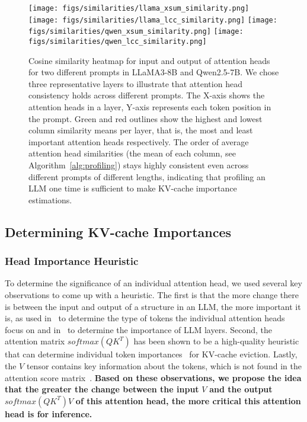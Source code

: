 \begin{figure}[h]
    \centering

    \texttt{[image: figs/similarities/llama\_xsum\_similarity.png]}
    \texttt{[image: figs/similarities/llama\_lcc\_similarity.png]}
    \hdashrule{\linewidth}{0.5pt}{1mm 1mm} %
    \texttt{[image: figs/similarities/qwen\_xsum\_similarity.png]}
    \texttt{[image: figs/similarities/qwen\_lcc\_similarity.png]}
    \caption{Cosine similarity heatmap for input and output of attention heads for two different prompts in LLaMA3-8B and Qwen2.5-7B. We chose three representative layers to illustrate that attention head consistency holds across different prompts. The X-axis shows the attention heads in a layer, Y-axis represents each token position in the prompt. Green and red outlines show the highest and lowest column similarity means per layer, that is, the most and least important attention heads respectively.  
    The order of average attention head similarities (the mean of each column, see Algorithm~\ref{alg:profiling}) stays highly consistent even across different prompts of different lengths, indicating that profiling an LLM one time is sufficient to make KV-cache importance estimations.}
    \label{fig:prompt_test} 
\end{figure}


\subsection{Determining KV-cache Importances}
\label{sec:determine_kv_importance}
\subsubsection{Head Importance Heuristic} 
To determine the significance of an individual attention head, we used several key observations to come up with a heuristic. The first is that the more change there is between the input and output of a structure in an LLM, the more important it is, as used in~\cite{ge2024model} to determine the type of tokens the individual attention heads focus on and in~\cite{squeezeattention, pyramidinfer} to determine the importance of LLM layers. Second, the attention matrix $softmax(QK^T)$ has been shown to be a high-quality heuristic that can determine individual token importances~\cite{h2o, scissorhands, keyformer} for KV-cache eviction. Lastly, the $V$ tensor contains key information about the tokens, which is not found in the attention score matrix~\cite{guo2024attention, devoto2024simple}. \textbf{Based on these observations, we propose the idea that the greater the change between the input} $V$ \textbf{and the output} $softmax(QK^T)V$ \textbf{ of this attention head, the more critical this attention head is for inference.}

